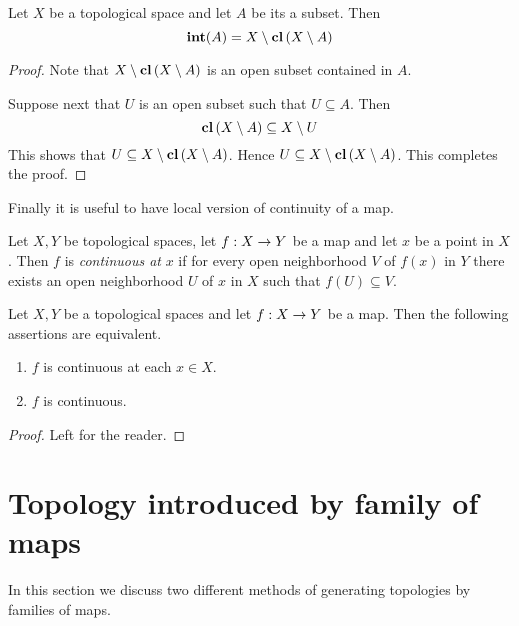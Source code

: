 \begin{fact}\label{fact:relation_between_closure_and_interior}
	Let $X$ be a topological space and let $A$ be its a subset. Then
	$$\mathbf{int}(A) = X\setminus \mathbf{cl}\left(X\setminus A\right)$$
\end{fact}
\begin{proof}
	Note that $X\setminus \mathbf{cl}\left(X\setminus A\right)$ is an open subset contained in $A$.

	Suppose next that $U$ is an open subset such that $U \subseteq A$. Then
	$$\mathbf{cl}\left(X\setminus A\right) \subseteq X\setminus U$$
	This shows that $U \subseteq X\setminus \mathbf{cl}\left(X\setminus A\right)$. Hence $U \subseteq X\setminus \mathbf{cl}\left(X\setminus A\right)$. This completes the proof.
\end{proof}
\noindent
Finally it is useful to have local version of continuity of a map.

\begin{definition}
	Let $X, Y$ be topological spaces, let $f:X\rightarrow Y$ be a map and let $x$ be a point in $X$. Then $f$ is \textit{continuous at} $x$ if for every open neighborhood $V$ of $f(x)$ in $Y$ there exists an open neighborhood $U$ of $x$ in $X$ such that $f(U) \subseteq V$.
\end{definition}

\begin{fact}\label{fact:function_continuous_at_each_point_is_continuous}
	Let $X, Y$ be a topological spaces and let $f:X\rightarrow Y$ be a map. Then the following assertions are equivalent.
	\begin{enumerate}[label=\emph{\textbf{(\roman*)}}, leftmargin=3.0em]
		\item $f$ is continuous at each $x \in X$.
		\item $f$ is continuous.
	\end{enumerate}
\end{fact}
\begin{proof}
	Left for the reader.
\end{proof}


\section{Topology introduced by family of maps}
\noindent
In this section we discuss two different methods of generating topologies by families of maps.

